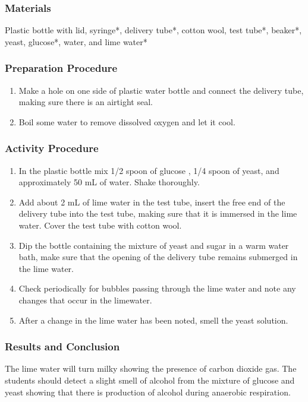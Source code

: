 \subsubsection*{Materials}
Plastic bottle with lid, syringe*, delivery tube*, cotton wool, test tube*, beaker*, yeast, glucose*, water, and lime water*

\subsubsection*{Preparation Procedure}
\begin{enumerate}
\item{Make a hole on one side of plastic water bottle and connect the delivery tube, making sure there is an airtight seal.}
\item{Boil some water to remove dissolved oxygen and let it cool.}
\end{enumerate}

\subsubsection*{Activity Procedure}
\begin{enumerate}
\item{In the plastic bottle mix 1/2 spoon of glucose , 1/4 spoon of yeast, and approximately 50 mL of water. Shake thoroughly.}
\item{Add about 2 mL of lime water in the test tube, insert the free end of the delivery tube into the test tube, making sure that it is immersed in the lime water. Cover the test tube with cotton wool.}
\item{Dip the bottle containing the mixture of yeast and sugar in a warm water bath, make sure that the opening of the delivery tube remains submerged in the lime water.}
\item{Check periodically for bubbles passing through the lime water and note any changes that occur in the limewater.}
\item{After a change in the lime water has been noted, smell the yeast solution.}
\end{enumerate}

\subsubsection*{Results and Conclusion}
The lime water will turn milky showing the presence of carbon dioxide gas.
The students should detect a slight smell of alcohol from the mixture of glucose and yeast showing that there is production of alcohol during anaerobic respiration.


